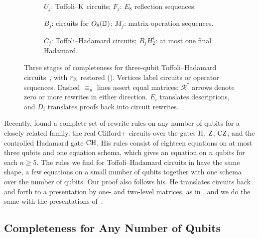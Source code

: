 \documentclass[acmsmall,screen,nonacm]{acmart}
\begin{document}
\begin{figure}[!thb]
\centering
\begin{subfigure}[t]{0.48\linewidth}
  \centering
  \caption{$U_j$: Toffoli--$\mathrm{K}$ circuits; $F_j$: $E_8$ reflection sequences.}
  \label{fig:amy-toffoli-k}
\end{subfigure}\hfill
\begin{subfigure}[t]{0.48\linewidth}
  \centering
  \caption{$B_j$: circuits for $O_8(\mathbb{D})$; $M_j$: matrix-operation sequences.}
  \label{fig:amy-dyadic-transfer}
\end{subfigure}

\medskip
\begin{subfigure}[t]{0.60\linewidth}
  \centering
  \caption{$C_j$: Toffoli--Hadamard circuits; $B_jH_2^{\epsilon}$: at most one final Hadamard.}
  \label{fig:amy-hadamard-extension}
\end{subfigure}
\caption{Three stages of completeness for three-qubit Toffoli--Hadamard circuits~\cite{amy2024toffoli}, with $r_{\mathrm{K}}$ restored (). Vertices label circuits or operator sequences. Dashed $\equiv_u$ lines assert equal matrices; $\mathcal R^{*}$ arrows denote zero or more rewrites in either direction. $E_i$ translates descriptions, and $D_i$ translates proofs back into circuit rewrites.}
\label{fig:amy-completeness}
\end{figure}

Recently, \citet{clement2026realcliffordch} found a complete set of rewrite rules on any number of qubits for a closely related family, the real Clifford+\CH{} circuits over the gates $\mathrm{H}$, $\mathrm{Z}$, $\mathrm{CZ}$, and the controlled Hadamard gate $\mathrm{CH}$. His rules consist of eighteen equations on at most three qubits and one equation schema, which gives an equation on $n$ qubits for each $n\ge5$. The rules we find for Toffoli--Hadamard circuits in  have the same shape, a few equations on a small number of qubits together with one schema over the number of qubits. Our proof also follows his. He translates circuits back and forth to a presentation by one- and two-level matrices, as in , and we do the same with the presentations of~\citet{li2021on}.
\fi
\subsection{Completeness for Any Number of Qubits}
\label{sec:arbitrary-qubit-completeness}
\fi
\end{document}
